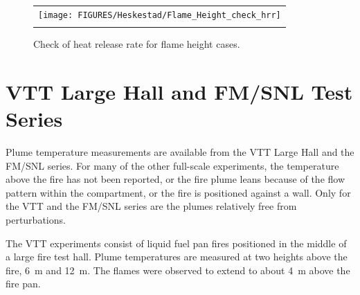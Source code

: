 \begin{figure}[p]
\begin{center}
\begin{tabular}{c}
\texttt{[image: FIGURES/Heskestad/Flame\_Height\_check\_hrr]} \\
\vspace{0.25in} \\
\end{tabular}
\end{center}
\caption[Check of heat release rate for flame height cases.]
{Check of heat release rate for flame height cases.}
\label{Flame_Height_check_hrr}
\end{figure}


\clearpage

\section{VTT Large Hall and FM/SNL Test Series}

\label{VTT_plume}

Plume temperature measurements are available from the VTT Large Hall and the FM/SNL series.
For many of the other full-scale experiments, the temperature above the fire has not been reported, or the fire plume
leans because of the flow pattern within the compartment, or the fire is positioned against a wall.
Only for the VTT and the FM/SNL series are the plumes relatively free from perturbations.

The VTT experiments consist of liquid fuel pan fires positioned in the middle of a large fire test hall.
Plume temperatures are measured at two heights above the fire, 6~m and 12~m.
The flames were observed to extend to about 4~m above the fire pan.




